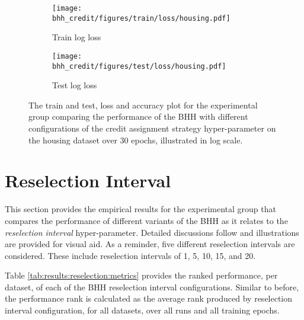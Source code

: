 \begin{figure}[H]
	\begin{subfigure}{0.5\textwidth}
		\centering
		\texttt{[image: bhh\_credit/figures/train/loss/housing.pdf]}
		\caption{Train log loss}
		\label{fig:results:credit:figures:loss:train:housing}
	\end{subfigure}
	\begin{subfigure}{0.5\textwidth}
		\centering
		\texttt{[image: bhh\_credit/figures/test/loss/housing.pdf]}
		\caption{Test log loss}
		\label{fig:results:credit:figures:loss:test:housing}
	\end{subfigure}
	\par\bigskip
	\caption{The train and test, loss and accuracy plot for the experimental group comparing the performance of the \acs{BHH} with different configurations of the credit assignment strategy hyper-parameter on the housing dataset over 30 epochs, illustrated in log scale.}
	\label{fig:results:credit:figures:housing}
\end{figure}



\section{Reselection Interval}\label{sec:results:reselection}

This section provides the empirical results for the experimental group that compares the performance of different variants of the \acs{BHH} as it relates to the \textit{reselection interval} hyper-parameter. Detailed discussions follow and illustrations are provided for visual aid. As a reminder, five different reselection intervals are considered. These include reselection intervals of 1, 5, 10, 15, and 20.

Table \ref{tab:results:reselection:metrics} provides the ranked performance, per dataset, of each of the \acs{BHH} reselection interval configurations. Similar to before, the performance rank is calculated as the average rank produced by reselection interval configuration, for all datasets, over all runs and all training epochs.

